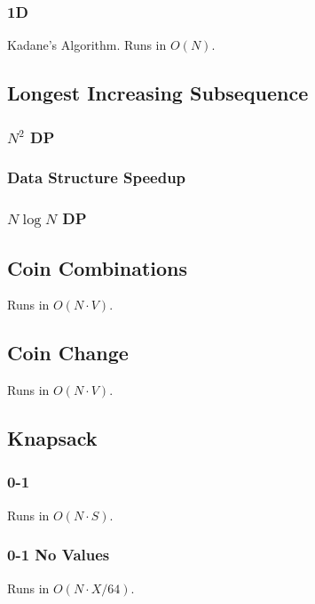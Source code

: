 \documentclass{article}
\begin{document}
\subsubsection{1D}
Kadane's Algorithm. Runs in $O(N)$.


\subsection{Longest Increasing Subsequence}
\subsubsection{$N^2$ DP}


\subsubsection{Data Structure Speedup}


\subsubsection{$N \log N$ DP}


\subsection{Coin Combinations}
Runs in $O(N \cdot V)$.


\subsection{Coin Change}
Runs in $O(N \cdot V)$.


\subsection{Knapsack}
\subsubsection{0-1}
Runs in $O(N \cdot S)$.


\subsubsection{0-1 No Values}
Runs in $O(N\cdot X / 64)$.

\end{document}
